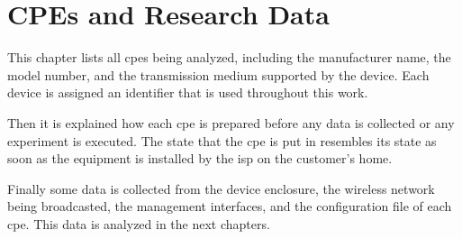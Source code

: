 \section{CPEs and Research Data}
\label{section:cpe_research_data}

This chapter lists all \glspl{cpe} being analyzed, including the manufacturer name, the model number, and the transmission medium supported by the device. Each device is assigned an identifier that is used throughout this work.

Then it is explained how each \gls{cpe} is prepared before any data is collected or any experiment is executed. The state that the \gls{cpe} is put in resembles its state as soon as the equipment is installed by the \gls{isp} on the customer’s home.

Finally some data is collected from the device enclosure, the wireless network being broadcasted, the management interfaces, and the configuration file of each \gls{cpe}. This data is analyzed in the next chapters.










